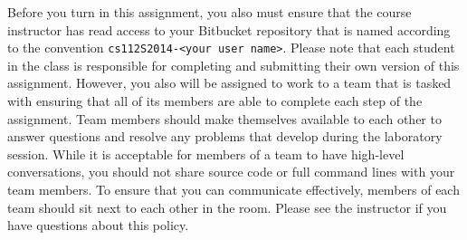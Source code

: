 Before you turn in this assignment, you also must ensure that the course instructor has read access to your Bitbucket
repository that is named according to the convention {\tt cs112S2014-<your user name>}. Please note that each student in
the class is responsible for completing and submitting their own version of this assignment.  However, you also will be
assigned to work to a team that is tasked with ensuring that all of its members are able to complete each step of the
assignment.  Team members should make themselves available to each other to answer questions and resolve any problems
that develop during the laboratory session. While it is acceptable for members of a team to have high-level
conversations, you should not share source code or full command lines with your team members. To ensure that you can
communicate effectively, members of each team should sit next to each other in the room.  Please see the instructor if
you have questions about this policy.




